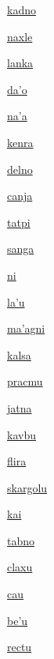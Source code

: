 {\hyperlink{val:kadno}{kadno}}{}{}{}

{\hyperlink{val:naxle}{naxle}}{}{}{}

{\hyperlink{val:lanka}{lanka}}{}{}{}

{\hyperlink{val:daho}{da'o}}{}{}{}

{\hyperlink{val:naha}{na'a}}{}{}{}

{\hyperlink{val:kenra}{kenra}}{}{}{}

{\hyperlink{val:delno}{delno}}{}{}{}

{\hyperlink{val:canja}{canja}}{}{}{}

{\hyperlink{val:tatpi}{tatpi}}{}{}{}

{\hyperlink{val:sanga}{sanga}}{}{}{}

{\hyperlink{val:ni}{ni}}{}{}{}

{\hyperlink{val:lahu}{la'u}}{}{}{}

{\hyperlink{val:mahagni}{ma'agni}}{}{}{}

{\hyperlink{val:kalsa}{kalsa}}{}{}{}

{\hyperlink{val:pracmu}{pracmu}}{}{}{}

{\hyperlink{val:jatna}{jatna}}{}{}{}

{\hyperlink{val:kavbu}{kavbu}}{}{}{}

{\hyperlink{val:flira}{flira}}{}{}{}

{\hyperlink{val:skargolu}{skargolu}}{}{}{}

{\hyperlink{val:kai}{kai}}{}{}{}

{\hyperlink{val:tabno}{tabno}}{}{}{}

{\hyperlink{val:claxu}{claxu}}{}{}{}

{\hyperlink{val:cau}{cau}}{}{}{}

{\hyperlink{val:behu}{be'u}}{}{}{}

{\hyperlink{val:rectu}{rectu}}{}{}{}

